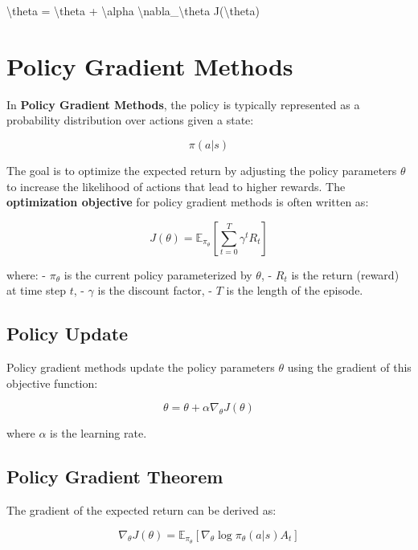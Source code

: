 \documentclass[
]{book}
\newenvironment{Shaded}{\begin{snugshade}}{\end{snugshade}}
\newcommand{\NormalTok}[1]{#1}
\begin{document}
\begin{Shaded}
\begin{Highlighting}[]
\NormalTok{\textbackslash{}theta = \textbackslash{}theta + \textbackslash{}alpha \textbackslash{}nabla\_\textbackslash{}theta J(\textbackslash{}theta)}
\end{Highlighting}
\end{Shaded}

\section{Policy Gradient Methods}\label{policy-gradient-methods-2}

In \textbf{Policy Gradient Methods}, the policy is typically represented as a probability distribution over actions given a state:

\[
\pi(a | s)
\]

The goal is to optimize the expected return by adjusting the policy parameters \(\theta\) to increase the likelihood of actions that lead to higher rewards. The \textbf{optimization objective} for policy gradient methods is often written as:

\[
J(\theta) = \mathbb{E}_{\pi_\theta} \left[ \sum_{t=0}^{T} \gamma^t R_t \right]
\]

where:
- \(\pi_\theta\) is the current policy parameterized by \(\theta\),
- \(R_t\) is the return (reward) at time step \(t\),
- \(\gamma\) is the discount factor,
- \(T\) is the length of the episode.

\subsection{Policy Update}\label{policy-update}

Policy gradient methods update the policy parameters \(\theta\) using the gradient of this objective function:

\[
\theta = \theta + \alpha \nabla_\theta J(\theta)
\]

where \(\alpha\) is the learning rate.

\subsection{Policy Gradient Theorem}\label{policy-gradient-theorem}

The gradient of the expected return can be derived as:

\[
\nabla_\theta J(\theta) = \mathbb{E}_{\pi_\theta} \left[ \nabla_\theta \log \pi_\theta(a | s) A_t \right]
\]
\end{document}
